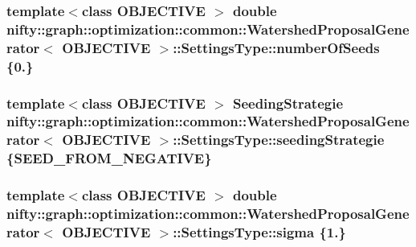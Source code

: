 \subsubsection[{number\+Of\+Seeds}]{\setlength{\rightskip}{0pt plus 5cm}template$<$class O\+B\+J\+E\+C\+T\+I\+V\+E $>$ double {\bf nifty\+::graph\+::optimization\+::common\+::\+Watershed\+Proposal\+Generator}$<$ O\+B\+J\+E\+C\+T\+I\+V\+E $>$\+::Settings\+Type\+::number\+Of\+Seeds \{0.\}}\label{structnifty_1_1graph_1_1optimization_1_1common_1_1WatershedProposalGenerator_1_1SettingsType_a3338af8695481fe196d0790e7420431e}
\hypertarget{structnifty_1_1graph_1_1optimization_1_1common_1_1WatershedProposalGenerator_1_1SettingsType_a78297dece4f18a625b737244f96ed96c}{}
\subsubsection[{seeding\+Strategie}]{\setlength{\rightskip}{0pt plus 5cm}template$<$class O\+B\+J\+E\+C\+T\+I\+V\+E $>$ {\bf Seeding\+Strategie} {\bf nifty\+::graph\+::optimization\+::common\+::\+Watershed\+Proposal\+Generator}$<$ O\+B\+J\+E\+C\+T\+I\+V\+E $>$\+::Settings\+Type\+::seeding\+Strategie \{{\bf S\+E\+E\+D\+\_\+\+F\+R\+O\+M\+\_\+\+N\+E\+G\+A\+T\+I\+V\+E}\}}\label{structnifty_1_1graph_1_1optimization_1_1common_1_1WatershedProposalGenerator_1_1SettingsType_a78297dece4f18a625b737244f96ed96c}
\hypertarget{structnifty_1_1graph_1_1optimization_1_1common_1_1WatershedProposalGenerator_1_1SettingsType_a0b4d05d3a9ac297009811b4744c0d947}{}
\subsubsection[{sigma}]{\setlength{\rightskip}{0pt plus 5cm}template$<$class O\+B\+J\+E\+C\+T\+I\+V\+E $>$ double {\bf nifty\+::graph\+::optimization\+::common\+::\+Watershed\+Proposal\+Generator}$<$ O\+B\+J\+E\+C\+T\+I\+V\+E $>$\+::Settings\+Type\+::sigma \{1.\}}\label{structnifty_1_1graph_1_1optimization_1_1common_1_1WatershedProposalGenerator_1_1SettingsType_a0b4d05d3a9ac297009811b4744c0d947}


